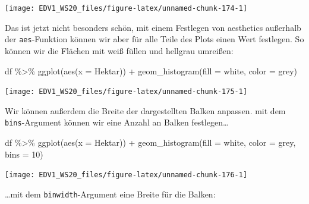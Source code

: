 \documentclass[
]{book}
\newenvironment{Shaded}{\begin{snugshade}}{\end{snugshade}}
\newcommand{\AttributeTok}[1]{\textcolor[rgb]{0.77,0.63,0.00}{#1}}
\newcommand{\DecValTok}[1]{\textcolor[rgb]{0.00,0.00,0.81}{#1}}
\newcommand{\FunctionTok}[1]{\textcolor[rgb]{0.00,0.00,0.00}{#1}}
\newcommand{\NormalTok}[1]{#1}
\newcommand{\SpecialCharTok}[1]{\textcolor[rgb]{0.00,0.00,0.00}{#1}}
\newcommand{\StringTok}[1]{\textcolor[rgb]{0.31,0.60,0.02}{#1}}
\begin{document}
\begin{center}\texttt{[image: EDV1\_WS20\_files/figure-latex/unnamed-chunk-174-1]} \end{center}

Das ist jetzt nicht besonders schön, mit einem Festlegen von aesthetics außerhalb der \texttt{aes}-Funktion können wir aber für alle Teile des Plots einen Wert festlegen. So können wir die Flächen mit weiß füllen und hellgrau umreißen:

\begin{Shaded}
\begin{Highlighting}[]
\NormalTok{df }\SpecialCharTok{\%\textgreater{}\%} 
  \FunctionTok{ggplot}\NormalTok{(}\FunctionTok{aes}\NormalTok{(}\AttributeTok{x =}\NormalTok{ Hektar)) }\SpecialCharTok{+}
  \FunctionTok{geom\_histogram}\NormalTok{(}\AttributeTok{fill =} \StringTok{\textquotesingle{}white\textquotesingle{}}\NormalTok{,}
                 \AttributeTok{color =} \StringTok{\textquotesingle{}grey\textquotesingle{}}\NormalTok{)}
\end{Highlighting}
\end{Shaded}

\begin{center}\texttt{[image: EDV1\_WS20\_files/figure-latex/unnamed-chunk-175-1]} \end{center}

Wir können außerdem die Breite der dargestellten Balken anpassen. mit dem \texttt{bins}-Argument können wir eine Anzahl an Balken festlegen\ldots{}

\begin{Shaded}
\begin{Highlighting}[]
\NormalTok{df }\SpecialCharTok{\%\textgreater{}\%} 
  \FunctionTok{ggplot}\NormalTok{(}\FunctionTok{aes}\NormalTok{(}\AttributeTok{x =}\NormalTok{ Hektar)) }\SpecialCharTok{+}
  \FunctionTok{geom\_histogram}\NormalTok{(}\AttributeTok{fill =} \StringTok{\textquotesingle{}white\textquotesingle{}}\NormalTok{,}
                 \AttributeTok{color =} \StringTok{\textquotesingle{}grey\textquotesingle{}}\NormalTok{,}
                 \AttributeTok{bins =} \DecValTok{10}\NormalTok{)}
\end{Highlighting}
\end{Shaded}

\begin{center}\texttt{[image: EDV1\_WS20\_files/figure-latex/unnamed-chunk-176-1]} \end{center}

\ldots mit dem \texttt{binwidth}-Argument eine Breite für die Balken:
\end{document}
